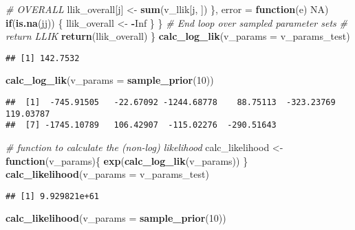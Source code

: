 \documentclass[
]{article}
\newenvironment{Shaded}{\begin{snugshade}}{\end{snugshade}}
\newcommand{\CommentTok}[1]{\textcolor[rgb]{0.56,0.35,0.01}{\textit{#1}}}
\newcommand{\ControlFlowTok}[1]{\textcolor[rgb]{0.13,0.29,0.53}{\textbf{#1}}}
\newcommand{\DataTypeTok}[1]{\textcolor[rgb]{0.13,0.29,0.53}{#1}}
\newcommand{\DecValTok}[1]{\textcolor[rgb]{0.00,0.00,0.81}{#1}}
\newcommand{\KeywordTok}[1]{\textcolor[rgb]{0.13,0.29,0.53}{\textbf{#1}}}
\newcommand{\NormalTok}[1]{#1}
\newcommand{\OperatorTok}[1]{\textcolor[rgb]{0.81,0.36,0.00}{\textbf{#1}}}
\newcommand{\OtherTok}[1]{\textcolor[rgb]{0.56,0.35,0.01}{#1}}
\newcommand{\StringTok}[1]{\textcolor[rgb]{0.31,0.60,0.02}{#1}}
\begin{document}
\begin{Shaded}
\begin{Highlighting}[]
      \CommentTok{# OVERALL }
\NormalTok{      llik_overall[j] <-}\StringTok{ }\KeywordTok{sum}\NormalTok{(v_llik[j, ])}
\NormalTok{    \}, }\DataTypeTok{error =} \ControlFlowTok{function}\NormalTok{(e) }\OtherTok{NA}\NormalTok{) }
    \ControlFlowTok{if}\NormalTok{(}\KeywordTok{is.na}\NormalTok{(jj)) \{ llik_overall <-}\StringTok{ }\OperatorTok{-}\OtherTok{Inf}\NormalTok{ \}}
\NormalTok{  \} }\CommentTok{# End loop over sampled parameter sets}
  \CommentTok{# return LLIK}
  \KeywordTok{return}\NormalTok{(llik_overall)}
\NormalTok{\}}
\KeywordTok{calc_log_lik}\NormalTok{(}\DataTypeTok{v_params =}\NormalTok{ v_params_test)}
\end{Highlighting}
\end{Shaded}

\begin{verbatim}
## [1] 142.7532
\end{verbatim}

\begin{Shaded}
\begin{Highlighting}[]
\KeywordTok{calc_log_lik}\NormalTok{(}\DataTypeTok{v_params =} \KeywordTok{sample_prior}\NormalTok{(}\DecValTok{10}\NormalTok{))}
\end{Highlighting}
\end{Shaded}

\begin{verbatim}
##  [1]  -745.91505   -22.67092 -1244.68778    88.75113  -323.23769   119.03787
##  [7] -1745.10789   106.42907  -115.02276  -290.51643
\end{verbatim}

\begin{Shaded}
\begin{Highlighting}[]
\CommentTok{# function to calculate the (non-log) likelihood}
\NormalTok{calc_likelihood <-}\StringTok{ }\ControlFlowTok{function}\NormalTok{(v_params)\{ }
  \KeywordTok{exp}\NormalTok{(}\KeywordTok{calc_log_lik}\NormalTok{(v_params)) }
\NormalTok{\}}
\KeywordTok{calc_likelihood}\NormalTok{(}\DataTypeTok{v_params =}\NormalTok{ v_params_test)}
\end{Highlighting}
\end{Shaded}

\begin{verbatim}
## [1] 9.929821e+61
\end{verbatim}

\begin{Shaded}
\begin{Highlighting}[]
\KeywordTok{calc_likelihood}\NormalTok{(}\DataTypeTok{v_params =} \KeywordTok{sample_prior}\NormalTok{(}\DecValTok{10}\NormalTok{))}
\end{Highlighting}
\end{Shaded}
\end{document}

